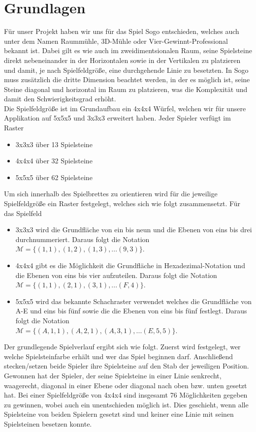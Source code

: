 \documentclass[a4paper]{scrartcl}
\begin{document}
\section{Grundlagen}\label{ch:Grundlagen}
Für unser Projekt haben wir uns für das Spiel Sogo entschieden, welches auch unter dem Namen Raummühle, 3D-Mühle oder Vier-Gewinnt-Professional bekannt ist. Dabei gilt es wie auch im zweidimentsionalen Raum, seine Spielsteine direkt nebeneinander in der Horizontalen sowie in der Vertikalen zu platzieren und damit, je nach Spielfeldgröße, eine durchgehende Linie zu besetzten. In Sogo muss zusätzlich die dritte Dimension beachtet werden, in der es möglich ist, seine Steine diagonal und horizontal im Raum zu platzieren, was die Komplexität und damit den Schwierigkeitsgrad erhöht.
\\
Die Spielfeldgröße ist im Grundaufbau ein 4x4x4 Würfel, welchen wir für unsere Applikation auf 5x5x5 und 3x3x3 erweitert haben. 
Jeder Spieler verfügt im Raster
	\begin{itemize}
		\item 3x3x3 über 13 Spielsteine
		\item 4x4x4 über 32 Spielsteine		
		\item 5x5x5 über 62 Spielsteine
	\end{itemize}
Um sich innerhalb des Spielbrettes zu orientieren wird für die jeweilige Spielfeldgröße ein Raster festgelegt, welches sich wie folgt zusammensetzt. 
Für das Spielfeld
\begin{itemize}
		\item 3x3x3 wird die Grundfläche von ein bis neun und die Ebenen von 		eins bis drei durchnummeriert. Daraus folgt die Notation \\ $\mathcal{M}=\{(1,1),(1,2),(1,3),...(9,3)\}$.
		\item 4x4x4 gibt es die Möglichkeit die Grundfläche in Hexadezimal-Notation und die Ebenen von eins bis vier aufzuteilen. Daraus folgt die Notation \\
$\mathcal{M}=\{(1,1),(2,1),(3,1),...(F,4)\}$.
		\item 5x5x5 wird das bekannte Schachraster verwendet welches die Grundfläche von A-E und eins bis fünf sowie die die Ebenen von eins bis fünf festlegt. Daraus folgt die Notation \\
$\mathcal{M}=\{(A,1,1),(A,2,1),(A,3,1),...(E,5,5)\}$.
	\end{itemize}
	
Der grundlegende Spielverlauf ergibt sich wie folgt. Zuerst wird festgelegt, wer welche Spielsteinfarbe erhält und wer das Spiel beginnen darf. Anschließend stecken/setzen beide Spieler ihre Spielsteine auf den Stab der jeweiligen Position. Gewonnen hat der Spieler, der seine Spielsteine in einer Linie senkrecht, waagerecht, diagonal in einer Ebene oder diagonal nach oben bzw. unten gesetzt hat. Bei einer Spielfeldgröße von 4x4x4 sind insgesamt 76 Möglichkeiten gegeben zu gewinnen, wobei auch ein unentschieden möglich ist. Dies geschieht, wenn alle Spielsteine von beiden Spielern gesetzt sind und keiner eine Linie mit seinen Spielsteinen besetzen konnte.
\end{document}
